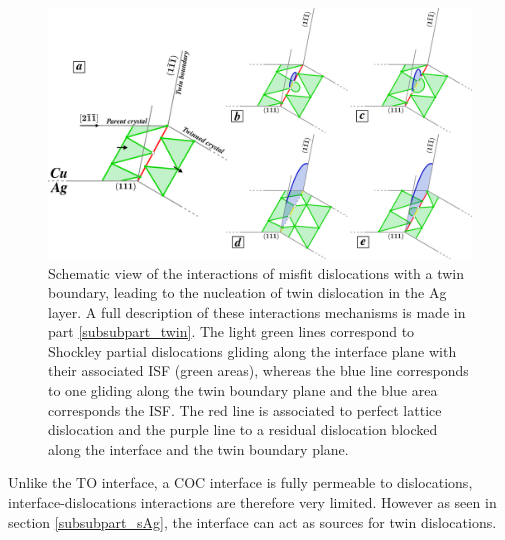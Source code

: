 \documentclass[final,3p,times,twocolumn]{elsarticle}
\begin{document}
\begin{figure}[!b]
	\begin{center}
		\includegraphics[width=150mm]{Pic/fig_ENT.eps} 
	\end{center}\caption{Schematic view of the interactions of misfit dislocations with a twin boundary, leading to the nucleation of twin dislocation in the Ag layer. A full description of these interactions mechanisms is made in part \ref{subsubpart_twin}. The light green lines correspond to Shockley partial dislocations gliding along the interface plane with their associated ISF (green areas), whereas the blue line corresponds to one gliding along the twin boundary plane and the blue area corresponds the ISF. The red line is associated to perfect lattice dislocation and the purple line to a residual dislocation blocked along the interface and the twin boundary plane.}\label{fig_ENT}
\end{figure}

Unlike the TO interface, a COC interface is fully permeable to dislocations, interface-dislocations interactions are therefore very limited. However as seen in section \ref{subsubpart_sAg}, the interface can act as sources for twin dislocations.

\end{document}
